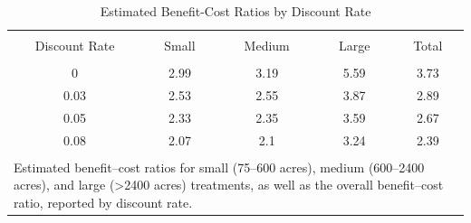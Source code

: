
\begin{table}[!htbp] \centering 
  \caption{\label{tab:BenefitCostRatios} Estimated Benefit-Cost Ratios by Discount Rate} 
  \label{} 
\begin{tabular}{@{\extracolsep{-4pt}} ccccc} 
\\[-1.8ex]\hline 
\hline \\[-1.8ex] 
Discount Rate & Small & Medium & Large & Total \\ 
\hline \\[-1.8ex] 
0 & 2.99 & 3.19 & 5.59 & 3.73 \\ 
0.03 & 2.53 & 2.55 & 3.87 & 2.89 \\ 
0.05 & 2.33 & 2.35 & 3.59 & 2.67 \\ 
0.08 & 2.07 & 2.1 & 3.24 & 2.39 \\ 
\hline \\[-1.8ex] 
\multicolumn{5}{l}{\parbox[t]{\textwidth}{\footnotesize{Estimated benefit–cost ratios for small (75–600 acres), medium (600–2400 acres), and large (>2400 acres) treatments, as well as the overall benefit–cost ratio, reported by discount rate.}}} \\ 
\end{tabular} 
\end{table} 
